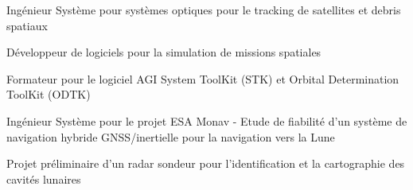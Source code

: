 \documentclass[]{deedy-resume-openfont}
\begin{document}
\begin{minipage}[t]{0.58\textwidth}
\vspace{\topsep} %
\begin{tightemize}
\item Ingénieur Système pour systèmes optiques pour le tracking de satellites et debris spatiaux  \\
\item Développeur de logiciels pour la simulation de missions spatiales \\
\item Formateur pour le logiciel AGI System ToolKit (STK) et Orbital Determination ToolKit (ODTK) \\
\end{tightemize}
\sectionsep

\vspace{\topsep} %
\begin{tightemize}
\item Ingénieur Système pour le projet ESA Monav - Etude de fiabilité d’un système de navigation hybride GNSS/inertielle pour la navigation vers la Lune
\end{tightemize}
\sectionsep

\vspace{\topsep} %
\begin{tightemize}
\item Projet préliminaire d’un radar sondeur pour l’identification et la cartographie des cavités lunaires
\end{tightemize}
\sectionsep




\end{minipage} 
\end{document}

